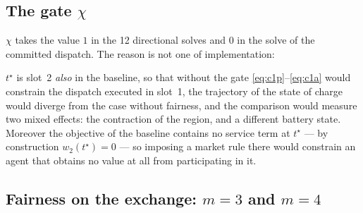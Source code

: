 \documentclass[11pt,a4paper]{article}
\newcommand{\nw}[1]{\textcolor{uaired}{#1}}
\newcommand{\tstar}{t^{\star}}
\begin{document}
\subsection{\nw{The gate $\chi$}}

$\chi$ takes the value $1$ in the 12 directional solves and $0$ in the solve of the committed
dispatch. The reason is not one of implementation:

\begin{keybox}
$\tstar$ is slot~2 \emph{also} in the baseline, so that without the gate
\eqref{eq:c1p}--\eqref{eq:c1a} would constrain the dispatch executed in slot~1, the trajectory of
the state of charge would diverge from the case without fairness, and the comparison would measure
two mixed effects: the contraction of the region, and a different battery state. Moreover the
objective of the baseline contains no service term at $\tstar$ --- by construction $w_2(\tstar)=0$
--- so imposing a market rule there would constrain an agent that obtains no value at all from
participating in it.
\end{keybox}

\subsection{\nw{Fairness on the exchange: $m=3$ and $m=4$}}\label{sec:exchange}
\end{document}
